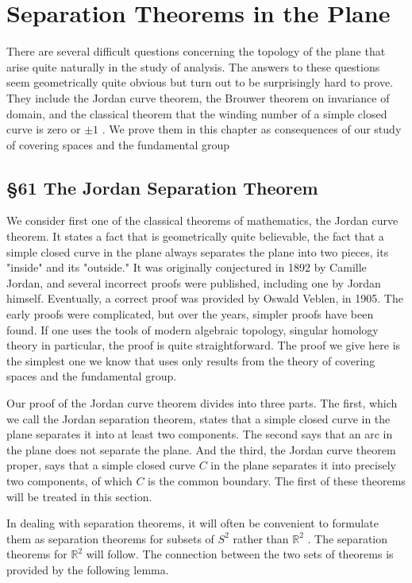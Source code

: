 \chapter{Separation Theorems in the Plane}

There are several difficult questions concerning the topology of the plane that arise quite naturally in the study of analysis. The answers to these questions seem geometrically quite obvious but turn out to be surprisingly hard to prove. They include the Jordan curve theorem, the Brouwer theorem on invariance of domain, and the classical theorem that the winding number of a simple closed curve is zero or \(\pm  1\) . We prove them in this chapter as consequences of our study of covering spaces and the fundamental group

\section*{ \S 61 The Jordan Separation Theorem}

We consider first one of the classical theorems of mathematics, the Jordan curve theorem. It states a fact that is geometrically quite believable, the fact that a simple closed curve in the plane always separates the plane into two pieces, its "inside" and its "outside." It was originally conjectured in 1892 by Camille Jordan, and several incorrect proofs were published, including one by Jordan himself. Eventually, a correct proof was provided by Oswald Veblen, in 1905. The early proofs were complicated, but over the years, simpler proofs have been found. If one uses the tools of modern algebraic topology, singular homology theory in particular, the proof is quite straightforward. The proof we give here is the simplest one we know that uses only results from the theory of covering spaces and the fundamental group.

Our proof of the Jordan curve theorem divides into three parts. The first, which we call the Jordan separation theorem, states that a simple closed curve in the plane separates it into at least two components. The second says that an arc in the plane does not separate the plane. And the third, the Jordan curve theorem proper, says that a simple closed curve \(C\) in the plane separates it into precisely two components, of which \(C\) is the common boundary. The first of these theorems will be treated in this section.

In dealing with separation theorems, it will often be convenient to formulate them as separation theorems for subsets of \({S}^{2}\) rather than \({\mathbb{R}}^{2}\) . The separation theorems for \({\mathbb{R}}^{2}\) will follow. The connection between the two sets of theorems is provided by the following lemma.

